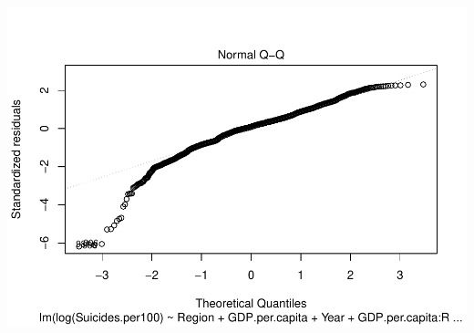 \documentclass[11pt,]{article}
\begin{document}
\includegraphics{An-Analysis-of-Suicide-Data_files/figure-latex/unnamed-chunk-11-2.pdf}
\end{document}
